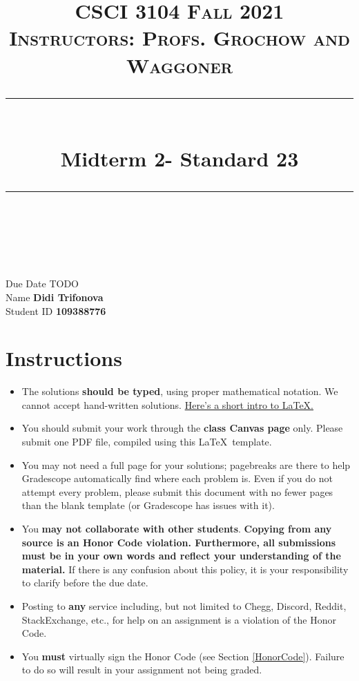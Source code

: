 \documentclass[11pt]{article}
\title{
\normalfont \normalsize 
\textsc{CSCI 3104 Fall 2021 \\ 
Instructors: Profs. Grochow and Waggoner} \\
[10pt] 
\rule{\linewidth}{0.5pt} \\[6pt] 
\huge Midterm 2- Standard 23 \\
\rule{\linewidth}{2pt}  \\[10pt]
}
\date{}
\theoremstyle{definition}
\theoremstyle{definition}
\theoremstyle{definition}
\begin{document}

\maketitle


\noindent
Due Date \dotfill TODO \\
Name \dotfill \textbf{Didi Trifonova} \\
Student ID \dotfill \textbf{109388776} \\


\tableofcontents

\section{Instructions}
 \begin{itemize}
	\item The solutions \textbf{should be typed}, using proper mathematical notation. We cannot accept hand-written solutions. \href{http://ece.uprm.edu/~caceros/latex/introduction.pdf}{Here's a short intro to \LaTeX.}
	\item You should submit your work through the \textbf{class Canvas page} only. Please submit one PDF file, compiled using this \LaTeX \ template.
	\item You may not need a full page for your solutions; pagebreaks are there to help Gradescope automatically find where each problem is. Even if you do not attempt every problem, please submit this document with no fewer pages than the blank template (or Gradescope has issues with it).

	\item You \textbf{may not collaborate with other students}. \textbf{Copying from any source is an Honor Code violation. Furthermore, all submissions must be in your own words and reflect your understanding of the material.} If there is any confusion about this policy, it is your responsibility to clarify before the due date. 

	\item Posting to \textbf{any} service including, but not limited to Chegg, Discord, Reddit, StackExchange, etc., for help on an assignment is a violation of the Honor Code.

	\item You \textbf{must} virtually sign the Honor Code (see Section \ref{HonorCode}). Failure to do so will result in your assignment not being graded.
\end{itemize}
\end{document}
